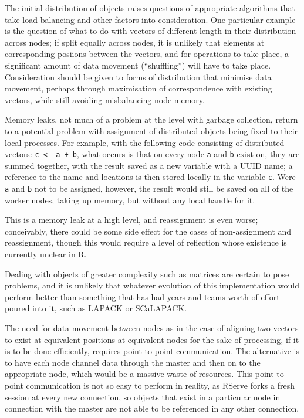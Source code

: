The initial distribution of objects raises questions of appropriate
algorithms that take load-balancing and other factors into
consideration. One particular example is the question of what to do with
vectors of different length in their distribution across nodes; if split
equally across nodes, it is unlikely that elements at corresponding
posiions between the vectors, and for operations to take place, a
significant amount of data movement (``shuffling'') will have to take
place. Consideration should be given to forms of distribution that
minimise data movement, perhaps through maximisation of correspondence
with existing vectors, while still avoiding misbalancing node memory.

Memory leaks, not much of a problem at the \R level with garbage
collection, return to a potential problem with assignment of distributed
objects being fixed to their local \R processes. For example, with the
following code consisting of distributed vectors:
\texttt{c\ \textless{}-\ a\ +\ b}, what occurs is that on every node
\texttt{a} and \texttt{b} exist on, they are summed together, with the
result saved as a new variable with a UUID name; a reference to the name
and locations is then stored locally in the variable \texttt{c}. Were
\texttt{a} and \texttt{b} not to be assigned, however, the result would
still be saved on all of the worker nodes, taking up memory, but without
any local handle for it.

This is a memory leak at a high level, and reassignment is even worse;
conceivably, there could be some side effect for the cases of
non-assignment and reassignment, though this would require a level of
reflection whose existence is currently unclear in R.

Dealing with objects of greater complexity such as matrices are certain
to pose problems, and it is unlikely that whatever evolution of this
implementation would perform better than something that has had years
and teams worth of effort poured into it, such as LAPACK or SCaLAPACK.

The need for data movement between nodes as in the case of aligning two
vectors to exist at equivalent positions at equivalent nodes for the
sake of processing, if it is to be done efficiently, requires
point-to-point communication. The alternative is to have each node
channel data through the master and then on to the appropriate node,
which would be a massive waste of resources. This point-to-point
communication is not so easy to perform in reality, as RServe forks a
fresh \R session at every new connection, so objects that exist in a
particular node in connection with the master are not able to be
referenced in any other connection.

